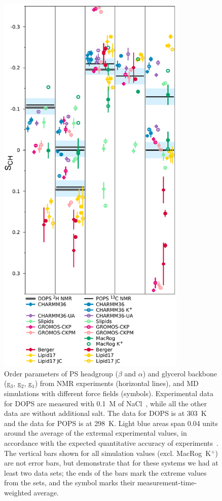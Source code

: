 \documentclass[aps,prl,superscriptaddress,twocolumn]{revtex4}
\begin{document}
\begin{figure}[]
  \centering
  \includegraphics[width=9.0cm]{../Figs/HGorderparametersPS.pdf}
  \caption{\label{HGorderParametersPS}
    Order parameters of PS headgroup ($\beta$ and $\alpha$) and
    glycerol backbone (g$_3$, g$_2$, g$_1$) from NMR experiments (horizontal lines),
    and MD simulations with different force fields (symbols).
    Experimental data for DOPS are measured with 0.1~M of NaCl~\cite{browning80},
    while all the other data are without additional salt.
    The data for DOPS is at 303~K and the data for POPS is at 298~K.
    Light blue areas span 0.04 units around the average of the extremal experimental values,
    in accordance with the expected quantitative accuracy of experiments~\cite{ollila16}.
    The vertical bars shown for all simulation values (excl. MacRog~K$^+$)
    are not error bars, but demonstrate that for these systems
    we had at least two data sets; the ends of the bars mark the extreme values
    from the sets, and the symbol marks their measurement-time-weighted average.
  }
\end{figure}
\end{document}

